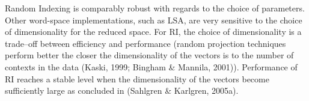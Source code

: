 Random Indexing is comparably robust with regards to the choice of parameters. Other
word-space implementations, such as LSA, are very sensitive to the choice of
dimensionality for the reduced space. For RI, the choice of dimensionality is a
trade--off between efficiency and performance (random projection techniques
perform better the closer the dimensionality of the vectors is to the number of
contexts in the data (Kaski, 1999; Bingham \& Mannila, 2001))\cite{kaski1999}\cite{bingham2001}. Performance of RI reaches a stable level
when the dimensionality of the vectors become sufficiently large as concluded in  (Sahlgren \& Karlgren, 2005a)\cite{karlgren2005}.